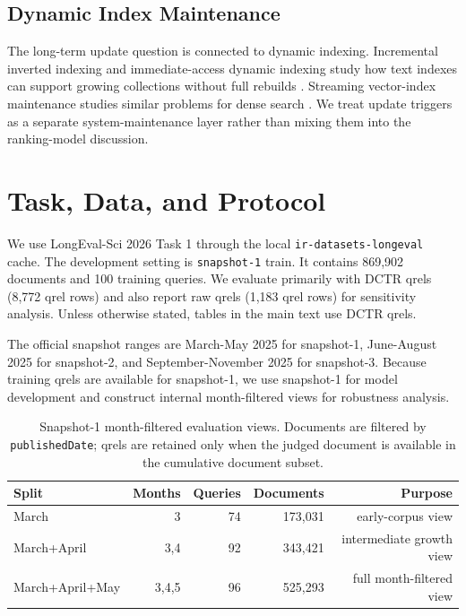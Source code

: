 \documentclass[11pt]{article}
\begin{document}
\subsection{Dynamic Index Maintenance}

The long-term update question is connected to dynamic indexing. Incremental inverted indexing and immediate-access dynamic indexing study how text indexes can support growing collections without full rebuilds \cite{brown_fast_nodate,asadi_fast_2013,moffat_efficient_2023}. Streaming vector-index maintenance studies similar problems for dense search \cite{mohoney_incremental_2024}. We treat update triggers as a separate system-maintenance layer rather than mixing them into the ranking-model discussion.

\section{Task, Data, and Protocol}

We use LongEval-Sci 2026 Task 1 through the local \texttt{ir-datasets-longeval} cache. The development setting is \texttt{snapshot-1} train. It contains 869,902 documents and 100 training queries. We evaluate primarily with DCTR qrels (8,772 qrel rows) and also report raw qrels (1,183 qrel rows) for sensitivity analysis. Unless otherwise stated, tables in the main text use DCTR qrels.

The official snapshot ranges are March-May 2025 for snapshot-1, June-August 2025 for snapshot-2, and September-November 2025 for snapshot-3. Because training qrels are available for snapshot-1, we use snapshot-1 for model development and construct internal month-filtered views for robustness analysis.

\begin{table}[ht]
\centering
\caption{Snapshot-1 month-filtered evaluation views. Documents are filtered by \texttt{publishedDate}; qrels are retained only when the judged document is available in the cumulative document subset.}
\label{tab:monthly-protocol}
\begin{tabular}{lrrrr}
\toprule
Split & Months & Queries & Documents & Purpose \\
\midrule
March & 3 & 74 & 173,031 & early-corpus view \\
March+April & 3,4 & 92 & 343,421 & intermediate growth view \\
March+April+May & 3,4,5 & 96 & 525,293 & full month-filtered view \\
\bottomrule
\end{tabular}
\end{table}
\end{document}
